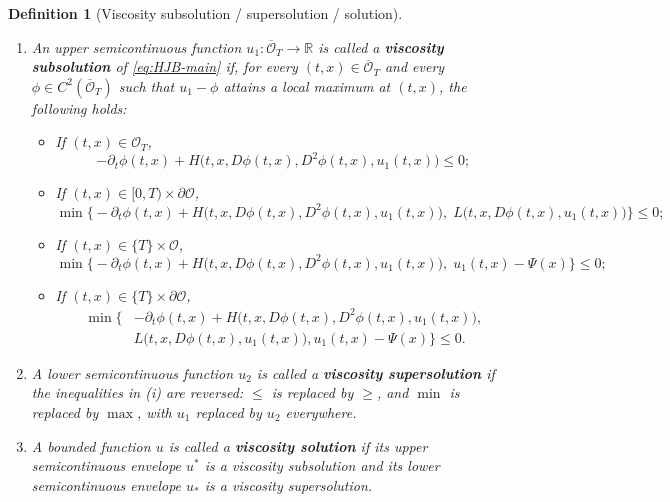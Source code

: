 \documentclass[10pt,a4paper]{amsart}
\newtheorem{definition}[theorem]{Definition}
\newcommand{\R}{\mathbb{R}}
\newcommand{\cO}{\mathcal{O}}
\begin{document}
	\begin{definition}[Viscosity subsolution / supersolution / solution] \upshape
		\label{def:viscosity}
		\hfill\strut
		\begin{enumerate}
			\item[\upshape(i)] An upper semicontinuous function $u_1:\overline{\cO}_T\to\R$ is called a \textbf{viscosity subsolution} of \eqref{eq:HJB-main} if, for every $(t,x)\in\overline{\cO}_T$ and every $\phi\in C^2(\overline{\cO}_T)$ such that $u_1-\phi$ attains a local maximum at $(t,x)$, the following holds:
			\begin{itemize}
				\item If $(t,x)\in\cO_T$,
				\begin{equation}
					-\partial_t\phi(t,x) + H\big(t,x,D\phi(t,x),D^2\phi(t,x),u_1(t,x)\big) \le 0;
					\label{eq:sub-interior}
				\end{equation}
				\item If $(t,x)\in[0,T)\times\partial\cO$,
				\begin{equation}
					\min\Big\{
					-\partial_t\phi(t,x) + H\big(t,x,D\phi(t,x),D^2\phi(t,x),u_1(t,x)\big),\;
					L\big(t,x,D\phi(t,x),u_1(t,x)\big)
					\Big\} \le 0;
					\label{eq:sub-boundary}
				\end{equation}
				\item If $(t,x)\in\{T\}\times\cO$,
				\begin{equation}
					\min\Big\{
					-\partial_t\phi(t,x) + H\big(t,x,D\phi(t,x),D^2\phi(t,x),u_1(t,x)\big),\;
					u_1(t,x)-\Psi(x)
					\Big\} \le 0;
					\label{eq:sub-terminal-interior}
				\end{equation}
				\item If $(t,x)\in\{T\}\times\partial\cO$,
				\begin{equation}
					\begin{split}
						\min\Big\{
						& -\partial_t\phi(t,x) + H\big(t,x,D\phi(t,x),D^2\phi(t,x),u_1(t,x)\big), \\
						& L\big(t,x,D\phi(t,x),u_1(t,x)\big),  u_1(t,x)-\Psi(x)
						\Big\} \le 0.
					\end{split}
					\label{eq:sub-terminal-boundary}
				\end{equation}
			\end{itemize}
			\item[\upshape(ii)] A lower semicontinuous function $u_2$ is called a \textbf{viscosity supersolution} if the inequalities in (i) are reversed: $\le$ is replaced by $\ge$, and $\min$ is replaced by $\max$, with $u_1$ replaced by $u_2$ everywhere.
			
			
			\item[\upshape(iii)] A bounded function $u$ is called a \textbf{viscosity solution} if its upper semicontinuous envelope $u^*$ is a viscosity subsolution and its lower semicontinuous envelope $u_*$ is a viscosity supersolution.
		\end{enumerate}
	\end{definition}
\end{document}
